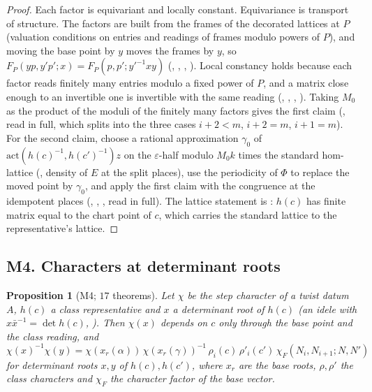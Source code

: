 \documentclass[11pt]{article}
\newtheorem{proposition}[theorem]{Proposition}
\theoremstyle{remark}
\begin{document}
\begin{proof}
Each factor is equivariant and locally constant. Equivariance is transport of structure. The factors are built from the frames of the decorated lattices at $P$ (valuation conditions on entries and readings of frames modulo powers of $P$), and moving the base point by $y$ moves the frames by $y$, so $F_P(yp,y'p';x)=F_P(p,p';y'^{-1}xy)$ (, , , ). Local constancy holds because each factor reads finitely many entries modulo a fixed power of $P$, and a matrix close enough to an invertible one is invertible with the same reading (, , , ). Taking $M_0$ as the product of the moduli of the finitely many factors gives the first claim (, read in full, which splits into the three cases $i+2<m$, $i+2=m$, $i+1=m$). For the second claim, choose a rational approximation $\gamma_0$ of $\mathrm{act}(h(c)^{-1},h(c')^{-1})z$ on the $\varepsilon$-half modulo $M_0k$ times the standard hom-lattice (, density of $E$ at the split places), use the periodicity of $\Phi$ to replace the moved point by $\gamma_0$, and apply the first claim with the congruence at the idempotent places (, , , read in full). The lattice statement is : $h(c)$ has finite matrix equal to the chart point of $c$, which carries the standard lattice to the representative's lattice.
\end{proof}

\subsection{M4. Characters at determinant roots}

\begin{proposition}[M4; $17$ theorems]\label{prop:M4}
Let $\chi$ be the step character of a twist datum $A$, $h(c)$ a class representative and $x$ a determinant root of $h(c)$ (an idele with $x\bar x^{-1}=\det h(c)$, ). Then $\chi(x)$ depends on $c$ only through the base point and the class reading, and
\[
\chi(x)^{-1}\chi(y)=\chi(x_r(\alpha))\,\chi(x_r(\gamma))^{-1}\,\rho_i(c)\,\rho'_i(c')\,\chi_F(N_i,N_{i+1};N,N')
\]
for determinant roots $x,y$ of $h(c),h(c')$, where $x_r$ are the base roots, $\rho,\rho'$ the class characters and $\chi_F$ the character factor of the base vector.
\end{proposition}
\end{document}
